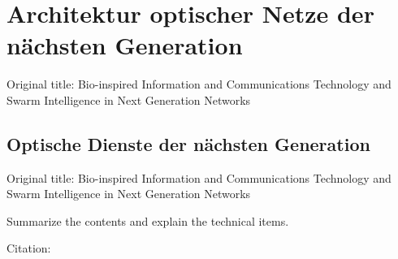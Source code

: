 \section{Architektur optischer Netze der n\"achsten Generation} 
%
Original title: Bio-inspired Information and Communications Technology and Swarm Intelligence in Next Generation Networks
\\

\subsection{Optische Dienste der n\"achsten Generation} 
%
Original title: Bio-inspired Information and Communications Technology and Swarm Intelligence in Next Generation Networks
\\
%


Summarize the contents and explain the technical items.

Citation: \cite{Ferstl.2006}
